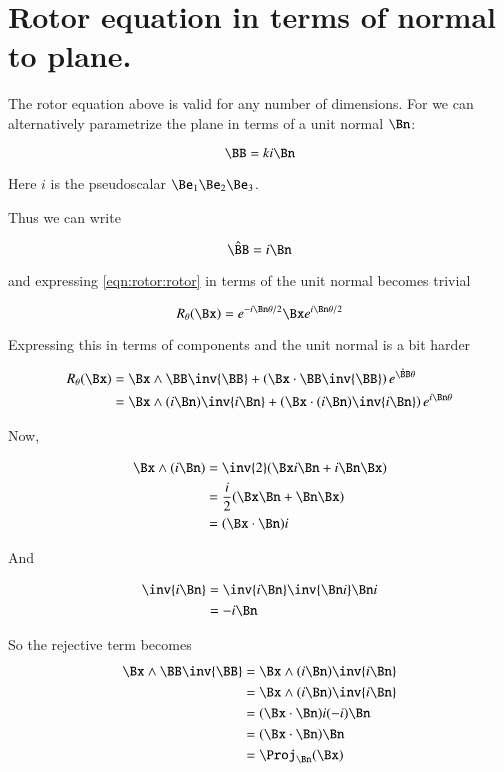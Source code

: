 \section{Rotor equation in terms of normal to plane. }

The rotor equation above is valid for any number of dimensions.  For  we can alternatively parametrize the plane in terms of
a unit normal $\Bn$:

\[
\BB = k i\Bn
\]

Here $i$ is the  pseudoscalar $\Be_1 \Be_2 \Be_3$.

Thus we can write

\[
\hat{\BB} = i\Bn
\]

and expressing \ref{eqn:rotor:rotor} in terms of the unit normal becomes trivial

\begin{equation}
R_\theta(\Bx) 
= e^{- i {\Bn}\theta/2} \Bx e^{i{\Bn}\theta/2}
\end{equation}

Expressing this in terms of components and the unit normal is a bit harder

\begin{align*}
R_\theta(\Bx) 
&= \Bx \wedge \BB \inv{\BB} + \left(\Bx \cdot \BB \inv{\BB}\right)e^{\hat{\BB}\theta} \\
&= \Bx \wedge (i\Bn) \inv{i\Bn} + \left(\Bx \cdot (i\Bn) \inv{i\Bn}\right)e^{{i\Bn}\theta} \\
\end{align*}

Now, 

\begin{align*}
\Bx \wedge (i\Bn) 
&= \inv{2}(\Bx i \Bn + i \Bn \Bx) \\
&= \frac{i}{2}(\Bx \Bn + \Bn \Bx) \\
&= (\Bx \cdot \Bn) i
\end{align*}

And

\begin{align*}
\inv{i\Bn} 
&= \inv{i\Bn} \inv{\Bn i} \Bn i \\
&= - i \Bn \\
\end{align*}

So the rejective term becomes
\begin{align*}
\Bx \wedge \BB \inv{\BB} 
&= \Bx \wedge (i\Bn) \inv{i\Bn} \\
&= \Bx \wedge (i\Bn) \inv{i\Bn} \\
&= (\Bx \cdot \Bn) i (-i) \Bn \\
&= (\Bx \cdot \Bn) \Bn \\
&= \Proj_{\Bn}(\Bx) \\
\end{align*}

